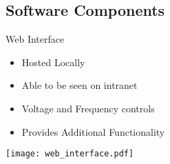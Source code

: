 
\subsection{Software Components}

\begin{frame}{Web Interface}
\begin{multicols}{2}
  \begin{itemize}
    \item Hosted Locally
    \item Able to be seen on intranet
    \item Voltage and Frequency controls
    \item Provides Additional Functionality
  \end{itemize}

\newpage

\texttt{[image: web\_interface.pdf]}

\end{multicols}
\end{frame}

